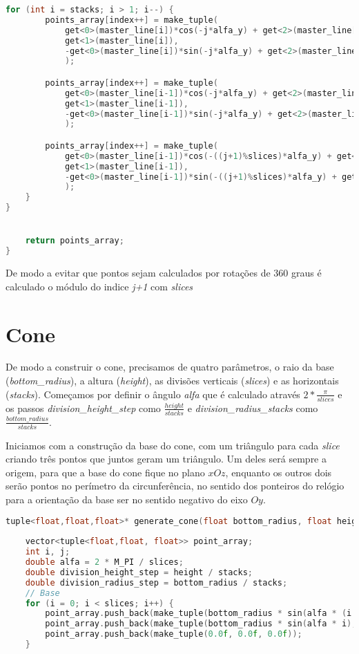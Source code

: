 \documentclass[14pt, a4 paper]{report}
\begin{document}
\begin{lstlisting}[language = c++]
    for (int i = stacks; i > 1; i--) {
        points_array[index++] = make_tuple(
            get<0>(master_line[i])*cos(-j*alfa_y) + get<2>(master_line[i])*sin(-j*alfa_y),
            get<1>(master_line[i]),
            -get<0>(master_line[i])*sin(-j*alfa_y) + get<2>(master_line[i])*cos(-j*alfa_y)
            );

        points_array[index++] = make_tuple(
            get<0>(master_line[i-1])*cos(-j*alfa_y) + get<2>(master_line[i-1])*sin(-j*alfa_y),
            get<1>(master_line[i-1]),
            -get<0>(master_line[i-1])*sin(-j*alfa_y) + get<2>(master_line[i-1])*cos(-j*alfa_y)
            );

        points_array[index++] = make_tuple(
            get<0>(master_line[i-1])*cos(-((j+1)%slices)*alfa_y) + get<2>(master_line[i-1])*sin(-((j+1)%slices)*alfa_y),
            get<1>(master_line[i-1]),
            -get<0>(master_line[i-1])*sin(-((j+1)%slices)*alfa_y) + get<2>(master_line[i-1])*cos(-((j+1)%slices)*alfa_y)
            );
    }
}


    return points_array;
}
\end{lstlisting}
De modo a evitar que pontos sejam calculados por rotações de $360$ graus é calculado o módulo do indice \textit{j+1} com \textit{slices} 

\section{Cone}
De modo a construir o cone, precisamos de quatro parâmetros, o raio da base (\textit{bottom\_radius}), a altura (\textit{height}), as divisões verticais (\textit{slices}) e as horizontais (\textit{stacks}).
Começamos por definir o ângulo \textit{alfa} que é calculado através $2 * \frac{\pi}{slices}$ e os passos \textit{division\_height\_step} como $\frac{height}{stacks}$ e \textit{division\_radius\_stacks} como $\frac{bottom\_radius}{stacks}$.

Iniciamos com a construção da base do cone, com um triângulo para cada \textit{slice} criando três pontos que juntos geram um triângulo. Um deles será sempre a origem, para que a base do cone fique no plano $xOz$, enquanto os outros dois serão pontos no perímetro da circunferência, no sentido dos ponteiros do relógio para a orientação da base ser no sentido negativo do eixo $Oy$.

\begin{lstlisting}[language = c++]
tuple<float,float,float>* generate_cone(float bottom_radius, float height, int slices, int stacks, int* total_points){
    
    vector<tuple<float,float, float>> point_array;
    int i, j;
    double alfa = 2 * M_PI / slices;
    double division_height_step = height / stacks;
    double division_radius_step = bottom_radius / stacks;
    // Base
    for (i = 0; i < slices; i++) {
        point_array.push_back(make_tuple(bottom_radius * sin(alfa * (i + 1)), 0.0f, bottom_radius * cos(alfa * (i + 1))));
        point_array.push_back(make_tuple(bottom_radius * sin(alfa * i), 0.0f, bottom_radius * cos(alfa * i)));
        point_array.push_back(make_tuple(0.0f, 0.0f, 0.0f));
    }
\end{lstlisting}
\end{document}
